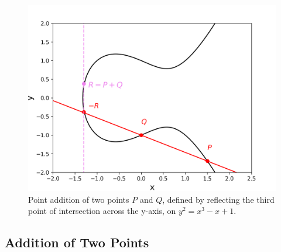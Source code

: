 \documentclass[11pt, a4paper]{report}
\begin{document}
\begin{figure}[ht]
\begin{center}
\includegraphics[width=.8\linewidth]{grouplaw.png} 
\caption{Point addition of two points $P$ and $Q$, defined by reflecting the third point of intersection across the y-axis, on $y^2 = x^3 -x+1$.}
\label{fig:additionEC}
\end{center}
\end{figure}

\subsection{Addition of Two Points}
\end{document}
